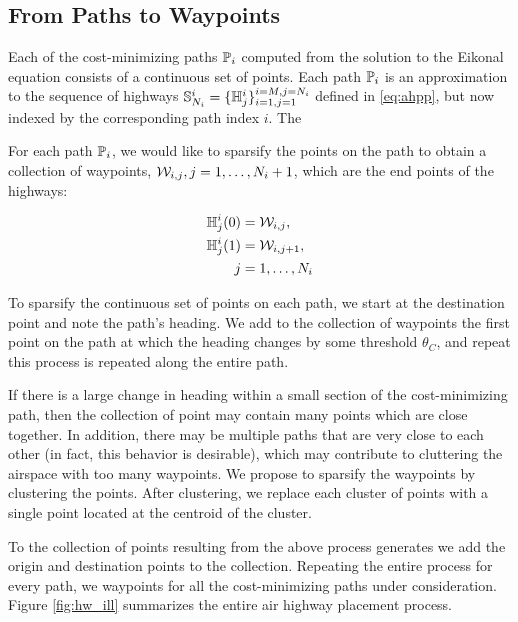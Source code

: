 \subsection{From Paths to Waypoints}
Each of the cost-minimizing paths $\mathbb{P}_i$ computed from the solution to the Eikonal equation consists of a continuous set of points. Each path $\mathbb{P}_i$ is an approximation to the sequence of highways $\mathbb{S}_{N_i}^i = \{\mathbb{H}^i_j\}_{i=1,j=1}^{i=M,j=N_i}$ defined in \eqref{eq:ahpp}, but now indexed by the corresponding path index $i$. The 

For each path $\mathbb{P}_i$, we would like to sparsify the points on the path to obtain a collection of waypoints, $\mathcal{W}_{i,j}, j = 1,\ldots, N_i+1$, which are the end points of the highways:

\begin{equation}
\begin{aligned}
\mathbb{H}^i_j(0) &= \mathcal{W}_{i,j}, \\
\mathbb{H}^i_j(1) &= \mathcal{W}_{i,j+1}, \\
j &= 1,\ldots,N_i
\end{aligned}
\end{equation}

To sparsify the continuous set of points on each path, we start at the destination point and note the path's heading. We add to the collection of waypoints the first point on the path at which the heading changes by some threshold $\theta_C$, and repeat this process is repeated along the entire path.

If there is a large change in heading within a small section of the cost-minimizing path, then the collection of point may contain many points which are close together. In addition, there may be multiple paths that are very close to each other (in fact, this behavior is desirable), which may contribute to cluttering the airspace with too many waypoints. We propose to sparsify the waypoints by clustering the points. After clustering, we replace each cluster of points with a single point located at the centroid of the cluster. 

To the collection of points resulting from the above process generates we add the origin and destination points to the collection. Repeating the entire process for every path, we waypoints for all the cost-minimizing paths under consideration. Figure \ref{fig:hw_ill} summarizes the entire air highway placement process.
